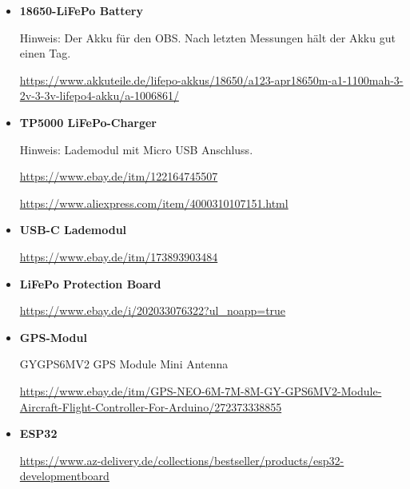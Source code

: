 \documentclass{scrartcl}
\begin{document}
\begin{itemize}
	
	
	\item \textbf{18650-LiFePo Battery}
	
	Hinweis: Der Akku für den OBS. Nach letzten Messungen hält der Akku gut
	einen Tag. 
	
	\href{https://www.google.com/url?q=https://www.akkuteile.de/lifepo-akkus/18650/a123-apr18650m-a1-1100mah-3-2v-3-3v-lifepo4-akku/a-1006861/\&sa=D\&ust=1588976963770000}{https://www.akkuteile.de/lifepo-akkus/18650/a123-apr18650m-a1-1100mah-3-2v-3-3v-lifepo4-akku/a-1006861/}
	
	
	
	\item \textbf{TP5000 LiFePo-Charger}
	
	Hinweis: Lademodul mit Micro USB Anschluss. 
	
	\href{https://www.google.com/url?q=https://www.ebay.de/itm/122164745507\&sa=D\&ust=1588976963771000}{https://www.ebay.de/itm/122164745507}
	
	\href{https://www.google.com/url?q=https://www.aliexpress.com/item/4000310107151.html\&sa=D\&ust=1588976963771000}{https://www.aliexpress.com/item/4000310107151.html}
	
	
	
	\item \textbf{USB-C Lademodul}
	
	\href{https://www.google.com/url?q=https://www.ebay.de/itm/173893903484\&sa=D\&ust=1588976963772000}{https://www.ebay.de/itm/173893903484}
	
	
	
	\item \textbf{LiFePo Protection Board}
	
	\href{https://www.google.com/url?q=https://www.ebay.de/i/202033076322?ul_noapp\%3Dtrue\&sa=D\&ust=1588976963773000}{https://www.ebay.de/i/202033076322?ul\_noapp=true}
	
	
	
	\item \textbf{GPS-Modul}
	
	GYGPS6MV2 GPS Module Mini Antenna
	
	\href{https://www.google.com/url?q=https://www.ebay.de/itm/GPS-NEO-6M-7M-8M-GY-GPS6MV2-Module-Aircraft-Flight-Controller-For-Arduino/272373338855\&sa=D\&ust=1588976963774000}{https://www.ebay.de/itm/GPS-NEO-6M-7M-8M-GY-GPS6MV2-Module-Aircraft-Flight-Controller-For-Arduino/272373338855}
	
	
	
	\item \textbf{ESP32}
	
	\href{https://www.google.com/url?q=https://www.az-delivery.de/collections/bestseller/products/esp32-developmentboard\&sa=D\&ust=1588976963775000}{https://www.az-delivery.de/collections/bestseller/products/esp32-developmentboard}

\end{itemize}
\end{document}
